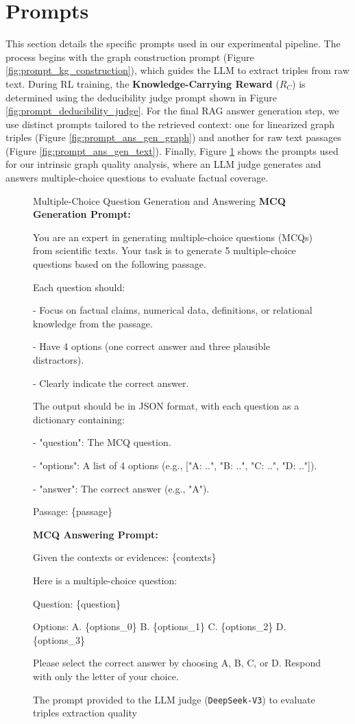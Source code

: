 \documentclass[11pt]{article}
\begin{document}
\section{Prompts}
\label{sec:appendix_prompts}

This section details the specific prompts used in our experimental pipeline. The process begins with the graph construction prompt (Figure \ref{fig:prompt_kg_construction}), which guides the LLM to extract triples from raw text. During RL training, the \textbf{Knowledge-Carrying Reward} ($R_C$) is determined using the deducibility judge prompt shown in Figure \ref{fig:prompt_deducibility_judge}. For the final RAG answer generation step, we use distinct prompts tailored to the retrieved context: one for linearized graph triples (Figure \ref{fig:prompt_ans_gen_graph}) and another for raw text passages (Figure \ref{fig:prompt_ans_gen_text}). Finally, Figure \ref{fig:prompt_intrinsic_eval} shows the prompts used for our intrinsic graph quality analysis, where an LLM judge generates and answers multiple-choice questions to evaluate factual coverage.
\begin{figure}[H]
    \small
    \begin{AIbox}{{Multiple-Choice Question Generation and Answering}}
\textbf{MCQ Generation Prompt:}

You are an expert in generating multiple-choice questions (MCQs) from scientific texts.
Your task is to generate 5 multiple-choice questions based on the following passage.

Each question should:

\quad - Focus on factual claims, numerical data, definitions, or relational knowledge from the passage.

\quad - Have 4 options (one correct answer and three plausible distractors).

\quad - Clearly indicate the correct answer.


The output should be in JSON format, with each question as a dictionary containing:

\quad - "question": The MCQ question.

\quad - "options": A list of 4 options (e.g., ["A: ..", "B: ..", "C: ..", "D: .."]).

\quad - "answer": The correct answer (e.g., "A").

Passage:
\{passage\}

\hrulefill

\textbf{MCQ Answering Prompt:}

Given the contexts or evidences:
\{contexts\}

Here is a multiple-choice question:

Question: \{question\}

Options:
A. \{options\_0\}
B. \{options\_1\}
C. \{options\_2\}
D. \{options\_3\}

Please select the correct answer by choosing A, B, C, or D. Respond with only the letter of your choice.
    \end{AIbox}
    \caption{The prompt provided to the LLM judge (\texttt{DeepSeek-V3}) to evaluate triples extraction quality}
    \label{fig:prompt_intrinsic_eval}
\end{figure}
\end{document}
